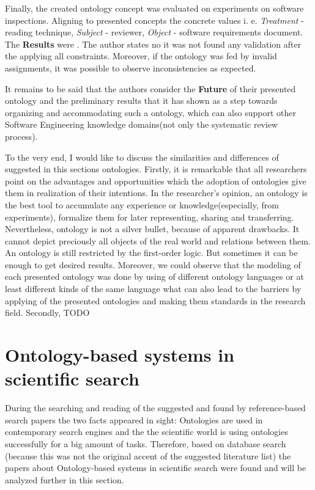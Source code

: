 	Finally, the created ontology concept was evaluated on experiments on software inspections\cite{Bas99}. Aligning to presented concepts the concrete values i. e. \textit{Treatment} - reading technique, \textit{Subject} - reviewer, \textit{Object} - software requirements document. The \textbf{Results} were \frqq\cite[p. 15]{SiyWu12}. The author states no it was not found any validation after the applying all constraints. Moreover, if the ontology was fed by  invalid assignments, it was possible to observe inconsistencies as expected.
	
	It remains to be said that the authors consider the \textbf{Future} of their presented ontology and the preliminary results that it has shown as a step towards organizing and accommodating such a ontology, which can also support other Software Engineering knowledge domains(not only the systematic review process).  \newline
	
	
	To the very end, I would like to discuss the similarities and differences of suggested in this sections ontologies. Firstly, it is remarkable that all researchers point on the advantages and opportunities which the adoption of ontologies give them in realization of their intentions. In the researcher's opinion, an ontology is the best tool to accumulate any experience or knowledge(especially, from experiments), formalize them for later representing, sharing and transferring. Nevertheless, ontology is not a silver bullet, because of apparent drawbacks. It cannot depict preciously all objects of the real world and relations between them. An ontology is still restricted by the first-order logic. But sometimes it can be enough to get desired results. Moreover, we could observe that the modeling of each presented ontology was done by using of different ontology languages or at least different kinds of the same language what can also lead to the barriers by applying of the presented ontologies and making them standards in the research field. Secondly, TODO    	 
\section{Ontology-based systems in scientific search}
During the searching and reading of the suggested and found by reference-based search papers the two facts appeared in sight: Ontologies are used in contemporary search engines and the the scientific world is using ontologies successfully for a big amount of tasks. Therefore, based on database search (because this was not the original accent of the suggested literature list) the papers about Ontology-based systems in scientific search were found and will be analyzed further in this section.

